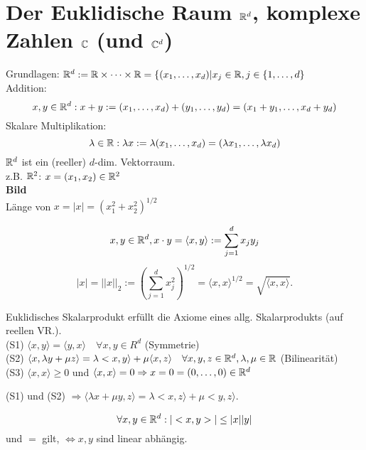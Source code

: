 \documentclass[../ana1.tex]{subfiles}
\begin{document}
\setcounter{section}{11}

\section{Der Euklidische Raum \( \mathbb{R}^d \), komplexe Zahlen \( \mathbb{C} \) (und \(\mathbb{C}^d \))}
Grundlagen: \( \mathbb{R}^d := \mathbb{R} \times \cdots \times \mathbb{R} = \{ (x_1, \dots, x_d) | x_j \in\mathbb{R}, j\in \{1,\dots, d \} \) \\
Addition:
\[x, y \in \mathbb{R}^d: x + y := (x_1, \dots , x_d) + (y_1, \dots, y_d) = (x_1 + y_1, \dots, x_d + y_d) \]
Skalare Multiplikation:
\[\lambda \in \mathbb{R}: \lambda x := \lambda(x_1, \dots , x_d) = (\lambda x_1, \dots, \lambda x_d) \]
\( \mathbb{R}^d \) ist ein (reeller) \(d\)-dim. Vektorraum.\\
z.B. \(\mathbb{R}^2\): \(x = (x_1, x_2) \in \mathbb{R}^2\) \\
\textbf{Bild}\\%
Länge von \(x = |x| = {{(x_1^2 + x_2^2)}^{1/2}}\)
\begin{defi}
	\[ x,y \in\mathbb{R}^d, x\cdot y = \langle x,y\rangle := \sum_{j=1}^{d}x_j y_j \]
	\[ |x| = ||x||_2 := {(\sum_{j=1}^{d} x_j^2 )}^{1/2} = \langle x,x\rangle^{1/2} = \sqrt{\langle x,x\rangle}. \]
\end{defi}
\begin{bem}
	Euklidisches Skalarprodukt erfüllt die Axiome eines allg. Skalarprodukts (auf reellen VR.).\\
	(S1) \( \langle x,y\rangle = \langle y,x\rangle \quad\forall x,y\in R^d \) (Symmetrie)\\
	(S2) \( \langle x, \lambda y + \mu z\rangle = \lambda <x,y\rangle + \mu\langle x,z\rangle \quad \forall x,y,z\in\mathbb{R}^d, \lambda, \mu \in\mathbb{R} \) (Bilinearität)\\
	(S3) \( \langle x,x\rangle \geq 0 \) und \( \langle x,x\rangle = 0 \Rightarrow x=0 = (0,\dots,0) \in\mathbb{R}^d \)
\end{bem}
\begin{bem}
	(S1) und (S2) \( \Rightarrow \langle\lambda x + \mu y, z\rangle = \lambda <x,z\rangle + \mu <y,z\rangle \).
\end{bem}
\begin{satz}
	\[ \forall x,y\in\mathbb{R}^d: |<x,y>|\leq |x||y|\]
	und \glqq{}\(=\)\grqq{} gilt, \( \Leftrightarrow x,y \) sind linear abhängig.
\end{satz}
\end{document}
